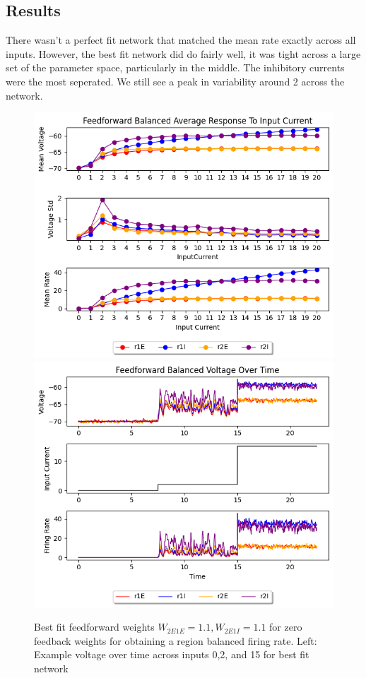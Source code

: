 \documentclass[10pt]{article}
\begin{document}
\subsection{Results}
There wasn't a perfect fit network that matched the mean rate exactly across all inputs. However, the best fit network did do fairly well, it was tight across a large set of the parameter space, particularly in the middle. The inhibitory currents were the most seperated. We still see a peak in variability around 2 across the network.
\begin{figure}[h]
    \includegraphics[scale=.5]{twoRegion/feedforwardAverageResponse.png}
    \includegraphics[scale=.5]{twoRegion/feedforwardVoltageOverTime.png}
    \caption{Best fit feedforward weights $W_{2E1E} = 1.1, W_{2E1I}=1.1$ for zero feedback weights for obtaining a region balanced firing rate. Left: Example voltage over time across inputs 0,2, and 15 for best fit network}
\end{figure}
\end{document}
